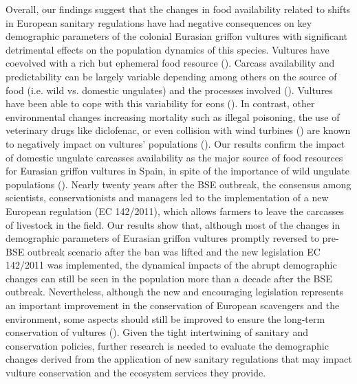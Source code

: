 \documentclass[12pt]{article}
\begin{document}
Overall, our findings suggest that the changes in food availability related to shifts in European sanitary regulations have had negative consequences on key demographic parameters of the colonial Eurasian griffon vultures with significant detrimental effects on the population dynamics of this species. Vultures have coevolved with a rich but ephemeral food resource (\cite{DeVault2003}). Carcass availability and predictability can be largely variable depending among others on the source of food (i.e. wild vs. domestic ungulates) and the processes involved (\cite{Moleon2014a}). Vultures have been able to cope with this variability for eons (\cite{Moleon2014}). In contrast, other environmental changes increasing mortality such as illegal poisoning, the use of veterinary drugs like diclofenac, or even collision with wind turbines (\cite{Martinez-Abrain2012,Margalida2021}) are known to negatively impact on vultures’ populations (\cite{Green2006a,Serrano2020}). Our results confirm the impact of domestic ungulate carcasses availability as the major source of food resources for Eurasian griffon vultures in Spain, in spite of the importance of wild ungulate populations (\cite{Mateo-Tomas2015,Blanco2019a}). Nearly twenty years after the BSE outbreak, the consensus among scientists, conservationists and managers led to the implementation of a new European regulation (EC 142/2011), which allows farmers to leave the carcasses of livestock in the field. Our results show that, although most of the changes in demographic parameters of Eurasian griffon vultures promptly reversed to pre-BSE outbreak scenario after the ban was lifted and the new legislation EC 142/2011 was implemented, the dynamical impacts of the abrupt demographic changes can still be seen in the population more than a decade after the BSE outbreak. Nevertheless, although the new and encouraging legislation represents an important improvement in the conservation of European scavengers and the environment, some aspects should still be improved to ensure the long-term conservation of vultures (\cite{Mateo-Tomas2019,Morales-Reyes2017,Blanco2016,Blanco2019a}). Given the tight intertwining of sanitary and conservation policies, further research is needed to evaluate the demographic changes derived from the application of new sanitary regulations that may impact vulture conservation and the ecosystem services they provide.
\end{document}
